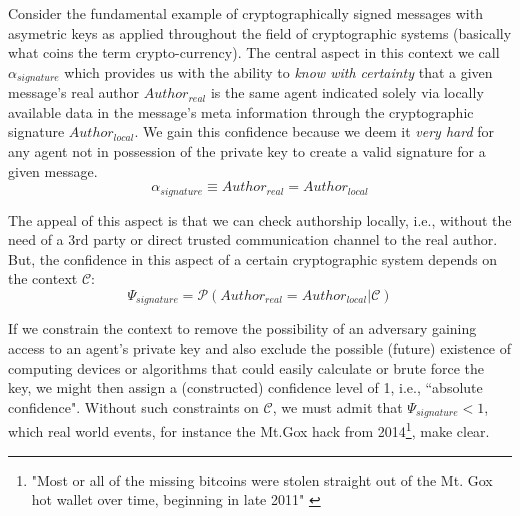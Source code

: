 \documentclass[twocolumn,showpacs,
  nofootinbib,aps,superscriptaddress,
  eqsecnum,prd,notitlepage,showkeys,10pt]{revtex4-1}
\begin{document}
Consider the fundamental example of cryptographically signed messages with asymetric keys as applied throughout the field of cryptographic systems (basically what coins the term crypto-currency). The central aspect in this context
we call $\alpha_{signature}$ which provides us with the ability to \textit{know with certainty} that a given message's real author $Author_{real}$ is the same agent indicated solely via locally available data in the message's meta information through the cryptographic signature $Author_{local}$. We gain this confidence because we deem it \textit{very hard} for any agent not in possession of the private key to create a valid signature for a given message.
\begin{equation}
\alpha_{signature} \equiv Author_{real} = Author_{local}
\end{equation}

The appeal of this aspect is that we can check authorship locally, i.e., without the need of a 3rd party or direct trusted communication channel to the real author.
But, the confidence in this aspect of a certain cryptographic system depends on the context $\mathcal{C}$:
\begin{equation}
\Psi_{signature} = \mathcal{P}(Author_{real} = Author_{local} | \mathcal{C})
\end{equation}

If we constrain the context to remove the possibility of an adversary gaining access to an agent's private key and also exclude the possible (future) existence of computing devices or algorithms that could easily calculate or brute force the key, we might then assign a (constructed) confidence level of 1, i.e., ``absolute confidence". Without such constraints on $\mathcal{C}$, we must admit that $\Psi_{signature}<1$, which real world events, for instance the Mt.Gox hack from 2014\footnote{"Most or all of the missing bitcoins were stolen straight out of the Mt. Gox hot wallet over time, beginning in late 2011" \cite{mt-gox}}, make clear.
\end{document}
